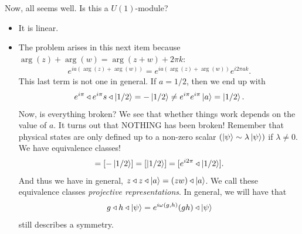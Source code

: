 \documentclass{book}
\theoremstyle{definition}
\begin{document}
Now, all seems well. Is this a $U(1)$-module? 
\begin{itemize}
	\item It is linear.
	\item The problem arises in this next item because $\arg(z) + \arg(w)  = \arg(z+w)+ 2\pi k$: 
	\begin{align}
	e^{ia(\arg(z) + \arg(w))} = e^{ia(\arg(z) + \arg(w))} e^{i2\pi a k}.
	\end{align}
	This last term is not one in general. If $a = 1/2$, then we end up with 
	\begin{align}
	e^{i\pi}\triangleleft e^{i\pi} s\triangleleft \ket{1/2} = -\ket{1/2} \neq e^{i\pi} e^{i\pi}\ket{a} = \ket{1/2}.
	\end{align}
	Now, is everything broken? We see that whether things work depends on the value of $a$. It turns out that NOTHING has been broken! Remember that physical states are only defined up to a non-zero scalar $(\ket{\psi} \sim \lambda \ket{\psi})$ if $\lambda \neq 0$. We have equivalence classes!
	\begin{align}
	[e^{i\pi}\triangleleft e^{i\pi}\triangleleft \ket{1/2}] = [-\ket{1/2}] = [\ket{1/2}] = [e^{i2\pi }\triangleleft \ket{1/2}]. 
	\end{align} 
	And thus we have in general, $z\triangleleft z \triangleleft \ket{a} = (zw)\triangleleft \ket{a}$. We call these equivalence classes \textit{projective representations}. In general, we will have that
	\begin{align}
	g\triangleleft h \triangleleft \ket{\psi} = e^{i\omega(g,h)} (gh)\triangleleft \ket{\psi}
	\end{align}
	still describes a symmetry. 
\end{itemize}
\end{document}
